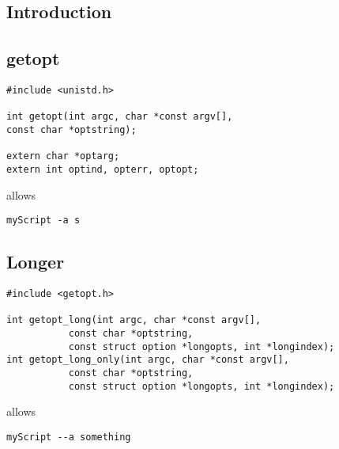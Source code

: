 
\subsection{Introduction}

\subsection{getopt}

\begin{verbatim}
#include <unistd.h>

int getopt(int argc, char *const argv[],
const char *optstring);

extern char *optarg;
extern int optind, opterr, optopt;

\end{verbatim}


allows
\begin{verbatim}
myScript -a s
\end{verbatim}

\subsection{Longer}

\begin{verbatim}
#include <getopt.h>

int getopt_long(int argc, char *const argv[],
           const char *optstring,
           const struct option *longopts, int *longindex);
int getopt_long_only(int argc, char *const argv[],
           const char *optstring,
           const struct option *longopts, int *longindex);
\end{verbatim}


allows
\begin{verbatim}
myScript --a something
\end{verbatim}

